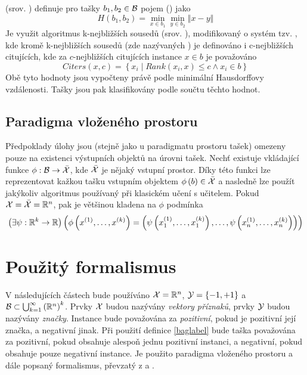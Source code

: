  (srov. \cite{wang_solving_2000}) definuje pro tašky \( b_1, b_2 \in \mathcal B \) pojem  () jako
\[ H \left( b_1, b_2 \right) = \min_{x \in b_1} \min_{y \in b_2} \left\Vert x - y \right\Vert \]
Je využit algoritmus k-nejbližších sousedů (srov. \cite{dasarathy_nearest_1991}), modifikovaný o systém tzv. , kde kromě k-nejbližších sousedů (zde nazývaných ) je definováno i c-nejbližších citujících, kde za \( c \)-nejbližších citujících instance \( x \in b \) je považováno
\[ Citers \left( x, c \right) = \left\{ x_i \middle| Rank \left( x_i, x \right) \leq c \land x_i \in b \right\} \]
Obě tyto hodnoty jsou vypočteny právě podle minimální Hausdorffovy vzdálenosti. Tašky jsou pak klasifikovány podle součtu těchto hodnot.

\subsection{Paradigma vloženého prostoru}
Předpoklady úlohy jsou (stejně jako u paradigmatu prostoru tašek) omezeny pouze na existenci výstupních objektů na úrovni tašek. Nechť existuje vkládající funkce \( \phi : \mathcal B \to \bar{\mathcal X} \), kde \( \bar{\mathcal X} \) je nějaký vstupní prostor. Díky této funkci lze reprezentovat kažkou tašku vstupním objektem \( \phi \left( b \right) \in \bar{\mathcal X} \) a nasledně lze použít jakýkoliv algoritmus používaný při klasickém učení s učitelem. Pokud \( \mathcal X = \bar{\mathcal X} = \mathbb R^n \), pak je většinou kladena na \( \phi \) podmínka
\begin{equation}
	\left( \exists \psi : \mathbb R^k \to \mathbb R \right) \left( \phi \left( x^{(1)}, \dots, x^{(k)} \right) = \left( \psi \left( x_1^{(1)}, \dots, x_1^{(k)} \right), \dots, \psi \left( x_n^{(1)}, \dots, x_n^{(k)} \right) \right) \right)
\end{equation}

\section{Použitý formalismus}\label{used_formalism}
V následujících částech bude používáno \( \mathcal X = \mathbb R^n \), \( \mathcal Y = \left\{ -1, +1 \right\} \) a \( \mathcal B \subset \bigcup_{k = 1}^{\infty} \left( \mathbb R^n \right) ^k \). Prvky \( \mathcal X \) budou nazývány \textit{vektory příznaků}, prvky \( \mathcal Y \) budou nazývány \textit{značky}. Instance bude považována za \textit{pozitivní}, pokud je pozitivní její značka, a negativní jinak. Při použití definice \ref{baglabel} bude taška považována za pozitivní, pokud obsahuje alespoň jednu pozitivní instanci, a negativní, pokud obsahuje pouze negativní instance. Je použito paradigma vloženého prostoru a dále popsaný formalismus, převzatý z \cite{pevny_using_2016} a \cite{pevny_discriminative_2016}.

